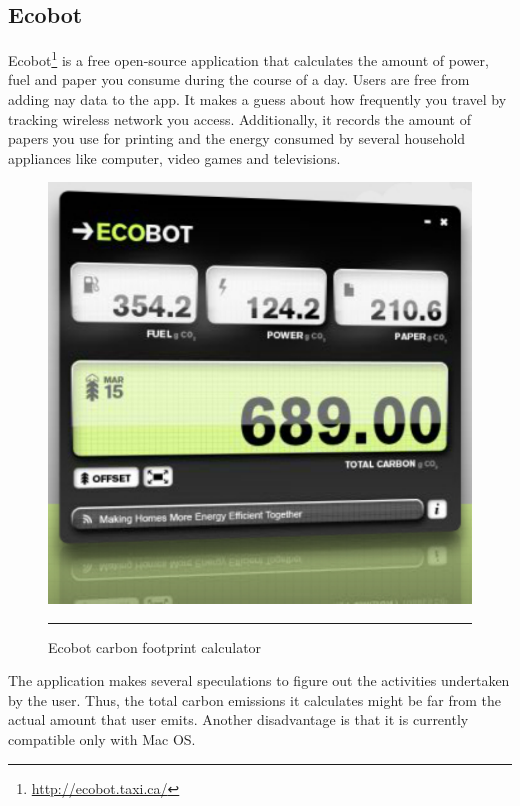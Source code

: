 \subsection{Ecobot}

Ecobot\footnote{\url{http://ecobot.taxi.ca/}} is a free open-source application that calculates the amount of power, fuel and paper you consume during the course of a day. Users are free from adding nay data to the app. It makes a guess about how frequently you travel by tracking wireless network you access. Additionally, it records the amount of papers you use for printing and the energy consumed by several household appliances like computer, video games and televisions.

\begin{figure}[htbp]
	\centering
		\includegraphics[scale=0.80]{./Figures/chapter2/figure21.pdf}
		\rule{35em}{0.5pt}
	\caption[Ecobot carbon footprint calculator]{Ecobot carbon footprint calculator}
	\label{fig:ecobot}
\end{figure}

The application makes several speculations to figure out the activities undertaken by the user. Thus, the total carbon emissions it calculates might be far from the actual amount that user emits. Another disadvantage is that it is currently compatible only with Mac OS.

